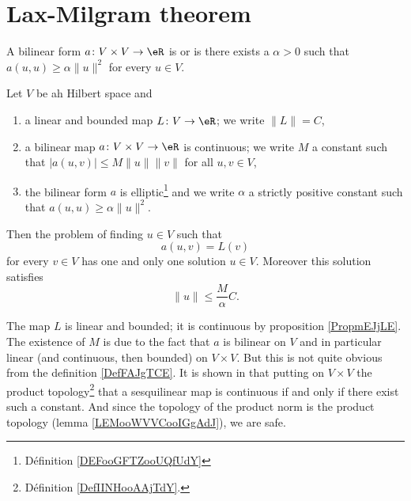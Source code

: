 
\section{Lax-Milgram theorem}

\begin{definition}  \label{DEFooGFTZooUQfUdY}
    A bilinear form \( a\colon V\times V\to \eR\) is  or  is there exists a \( \alpha>0\) such that \( a(u,u)\geq \alpha\| u \|^2\) for every \( u\in V\).
\end{definition}

\begin{theorem}       \label{THOooFDJYooCSNnuv}
    Let \( V\) be ah Hilbert space and
    \begin{enumerate}
        \item
            a linear and bounded map \( L\colon V\to \eR\); we write \( \| L \|=C\),
        \item
            a bilinear map \( a\colon V\times V\to \eR\) is continuous; we write \( M\) a constant such that \( | a(u,v) |\leq M\| u \|\| v \|\) for all \( u,v\in V\),
        \item
            the bilinear form \( a\) is elliptic\footnote{Définition \ref{DEFooGFTZooUQfUdY}} and we write \( \alpha\) a strictly positive constant such that \( a(u,u)\geq \alpha\| u \|^2\).
    \end{enumerate}
    Then the problem of finding \( u\in V\) such that 
    \begin{equation}
        a(u,v)=L(v)
    \end{equation}
    for every \( v\in V\) has one and only one solution \( u\in V\). Moreover this solution satisfies
    \begin{equation}
        \| u \|\leq \frac{ M }{ \alpha }C.
    \end{equation}
\end{theorem}
The map \( L\) is linear and bounded; it is continuous by proposition \ref{PropmEJjLE}. The existence of \( M\) is due to the fact that \( a\) is bilinear on \( V\) and in particular linear (and continuous, then bounded) on \( V\times V\). But this is not quite obvious from the definition \eqref{DefFAJgTCE}. It is shown in \cite{ooCUHNooNYIeGt} that putting on \( V\times V\) the product topology\footnote{Définition \ref{DefIINHooAAjTdY}.} that a sesquilinear map is continuous if and only if there exist such a constant. And since the topology of the product norm is the product topology (lemma \ref{LEMooWVVCooIGgAdJ}), we are safe.

